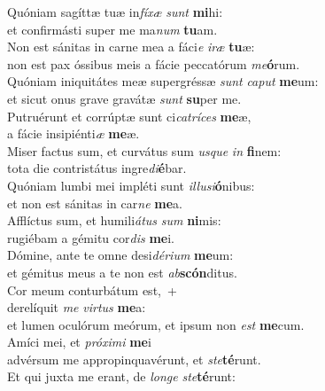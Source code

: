 \evenverse Quóniam sagíttæ tuæ in\textit{fí}\textit{xæ} \textit{sunt} \textbf{mi}hi:~\*\\
\evenverse et confirmásti super me ma\textit{num} \textbf{tu}am.\\
\oddverse Non est sánitas in carne mea a fáci\textit{e} \textit{i}\textit{ræ} \textbf{tu}æ:~\*\\
\oddverse non est pax óssibus meis a fácie peccatórum \textit{me}\textbf{ó}rum.\\
\evenverse Quóniam iniquitátes meæ supergréssæ \textit{sunt} \textit{ca}\textit{put} \textbf{me}um:~\*\\
\evenverse et sicut onus grave gravátæ \textit{sunt} \textbf{su}per me.\\
\oddverse Putruérunt et corrúptæ sunt ci\textit{ca}\textit{trí}\textit{ces} \textbf{me}æ,~\*\\
\oddverse a fácie insipiénti\textit{æ} \textbf{me}æ.\\
\evenverse Miser factus sum, et curvátus sum \textit{us}\textit{que} \textit{in} \textbf{fi}nem:~\*\\
\evenverse tota die contristátus ingre\textit{di}\textbf{é}bar.\\
\oddverse Quóniam lumbi mei impléti sunt \textit{il}\textit{lu}\textit{si}\textbf{ó}nibus:~\*\\
\oddverse et non est sánitas in car\textit{ne} \textbf{me}a.\\
\evenverse Afflíctus sum, et humili\textit{á}\textit{tus} \textit{sum} \textbf{ni}mis:~\*\\
\evenverse rugiébam a gémitu cor\textit{dis} \textbf{me}i.\\
\oddverse Dómine, ante te omne desi\textit{dé}\textit{ri}\textit{um} \textbf{me}um:~\*\\
\oddverse et gémitus meus a te non est \textit{ab}\textbf{scón}ditus.\\
\evenverse Cor meum conturbátum est,~+\\
\evenverse  derelíquit \textit{me} \textit{vir}\textit{tus} \textbf{me}a:~\*\\
\evenverse et lumen oculórum meórum, et ipsum non \textit{est} \textbf{me}cum.\\
\oddverse Amíci mei, et \textit{pró}\textit{xi}\textit{mi} \textbf{me}i~\*\\
\oddverse advérsum me appropinquavérunt, et \textit{ste}\textbf{té}runt.\\
\evenverse Et qui juxta me erant, de \textit{lon}\textit{ge} \textit{ste}\textbf{té}runt:~\*\\
